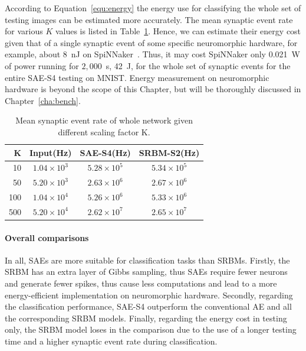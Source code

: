 According to Equation~\ref{equ:energy} the energy use for classifying the whole set of testing images can be estimated more accurately.
The mean synaptic event rate for various $K$ values is listed in Table~\ref{tbl:fire_rate}.
Hence, we can estimate their energy cost given that of a single synaptic event of some specific neuromorphic hardware, for example, about 8~nJ on SpiNNaker~\citep{stromatias2013power}.
Thus, it may cost SpiNNaker only 0.021~W of power running for $2,000$~s, 42~J, for the whole set of synaptic events for the entire SAE-S4 testing on MNIST.
Energy measurement on neuromorphic hardware is beyond the scope of this Chapter, but will be thoroughly discussed in Chapter~\ref{cha:bench}.
\begin{table}[htbp]
	\centering
	\caption[Mean synaptic event rate.]{Mean synaptic event rate of whole network given different scaling factor K.}
	\bgroup
	\def\arraystretch{1.4}
	\begin{tabular}{r c c c}
		K & Input(Hz) & SAE-S4(Hz) & SRBM-S2(Hz)\\
		\hline
		10 & $1.04 \times 10^3$ & $5.28 \times 10^5$ & $5.34 \times 10^5$ \\
		50 & $5.20 \times 10^3$ & $2.63 \times 10^6$ & $2.67 \times 10^6$ \\
		100 & $1.04 \times 10^4$ & $5.26 \times 10^6$ & $5.33 \times 10^6$ \\
		500 & $5.20 \times 10^4$ & $2.62 \times 10^7$ & $2.65 \times 10^7$ \\
	\end{tabular}
	\egroup
	\label{tbl:fire_rate}
\end{table}

\paragraph{Overall comparisons\\}

In all, SAEs are more suitable for classification tasks than SRBMs.
Firstly, the SRBM has an extra layer of Gibbs sampling, thus SAEs require fewer neurons and generate fewer spikes, thus cause less computations and lead to a  more energy-efficient implementation on neuromorphic hardware.
Secondly, regarding the classification performance, SAE-S4 outperform the conventional AE and all the corresponding SRBM models.
Finally, regarding the energy cost in testing only, the SRBM model loses in the comparison due to the use of a longer testing time and a higher synaptic event rate during classification.

